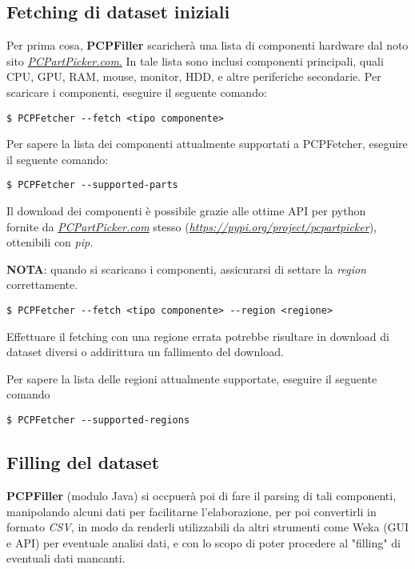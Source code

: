 \documentclass[12pt]{report}
\begin{document}
\newpage
\subsection{Fetching di dataset iniziali}

Per prima cosa, \textbf{PCPFiller} scaricherà una lista di componenti hardware dal noto \\
sito \underline{\textit{PCPartPicker.com}.} In tale lista sono inclusi componenti principali, quali
CPU, GPU, RAM, mouse, monitor, HDD, e altre periferiche secondarie.
Per scaricare i componenti, eseguire il seguente comando:
\begin{lstlisting}
$ PCPFetcher --fetch <tipo componente>
\end{lstlisting}

Per sapere la lista dei componenti attualmente supportati a PCPFetcher, eseguire il seguente comando:
\begin{lstlisting}
$ PCPFetcher --supported-parts
\end{lstlisting}

Il download dei componenti è possibile grazie alle ottime API per python \\
fornite da \underline{\textit{PCPartPicker.com}} stesso (\underline{\textit{https://pypi.org/project/pcpartpicker}}),
ottenibili con \textit{pip}.

\textbf{NOTA}: quando si scaricano i componenti, assicurarsi di settare la \textit{region} correttamente.
\begin{lstlisting}
$ PCPFetcher --fetch <tipo componente> --region <regione>
\end{lstlisting}

Effettuare il fetching con una regione errata potrebbe risultare in download di dataset diversi
o addirittura un fallimento del download.

Per sapere la lista delle regioni attualmente supportate, eseguire il seguente comando
\begin{lstlisting}
$ PCPFetcher --supported-regions
\end{lstlisting}

\newpage
\subsection{Filling del dataset}

\textbf{PCPFiller} (modulo Java) si occpuerà poi di fare il parsing di tali componenti, manipolando
alcuni dati per facilitarne l'elaborazione, per poi convertirli in formato \textit{CSV}, in modo da
renderli utilizzabili da altri strumenti come Weka (GUI e API) per eventuale analisi dati, e con lo
scopo di poter procedere al "filling" di eventuali dati mancanti.
\end{document}
